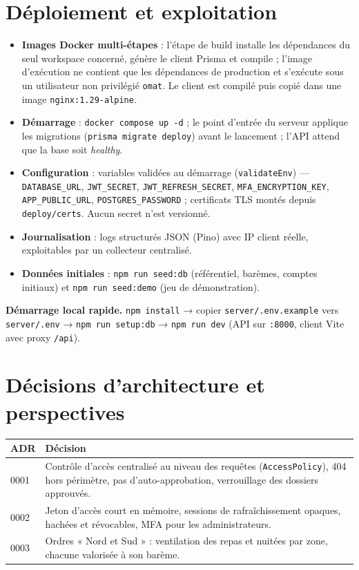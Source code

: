 \documentclass[10.5pt,a4paper]{article}
\newcommand{\code}[1]{\texttt{\small #1}}
\begin{document}
\section{Déploiement et exploitation}

\begin{itemize}
  \item \textbf{Images Docker multi-étapes} : l'étape de build installe les dépendances du seul workspace concerné, génère le client Prisma et compile ; l'image d'exécution ne contient que les dépendances de production et s'exécute sous un utilisateur non privilégié \code{omat}. Le client est compilé puis copié dans une image \code{nginx:1.29-alpine}.
  \item \textbf{Démarrage} : \code{docker compose up -d} ; le point d'entrée du serveur applique les migrations (\code{prisma migrate deploy}) avant le lancement ; l'API attend que la base soit \emph{healthy}.
  \item \textbf{Configuration} : variables validées au démarrage (\code{validateEnv}) --- \code{DATABASE\_URL}, \code{JWT\_SECRET}, \code{JWT\_REFRESH\_SECRET}, \code{MFA\_ENCRYPTION\_KEY}, \code{APP\_PUBLIC\_URL}, \code{POSTGRES\_PASSWORD} ; certificats TLS montés depuis \code{deploy/certs}. Aucun secret n'est versionné.
  \item \textbf{Journalisation} : logs structurés JSON (Pino) avec IP client réelle, exploitables par un collecteur centralisé.
  \item \textbf{Données initiales} : \code{npm run seed:db} (référentiel, barèmes, comptes initiaux) et \code{npm run seed:demo} (jeu de démonstration).
\end{itemize}

\begin{note}
\textbf{Démarrage local rapide.} \code{npm install} \;→\; copier \code{server/.env.example} vers \code{server/.env} \;→\;
\code{npm run setup:db} \;→\; \code{npm run dev} (API sur \code{:8000}, client Vite avec proxy \code{/api}).
\end{note}

\section{Décisions d'architecture et perspectives}

\begin{tabularx}{\textwidth}{@{}l X@{}}
\toprule
\textbf{ADR} & \textbf{Décision} \\
\midrule
0001 & Contrôle d'accès centralisé au niveau des requêtes (\code{AccessPolicy}), 404 hors périmètre, pas d'auto-approbation, verrouillage des dossiers approuvés. \\
0002 & Jeton d'accès court en mémoire, sessions de rafraîchissement opaques, hachées et révocables, MFA pour les administrateurs. \\
0003 & Ordres « Nord et Sud » : ventilation des repas et nuitées par zone, chacune valorisée à son barème. \\
\bottomrule
\end{tabularx}
\end{document}
